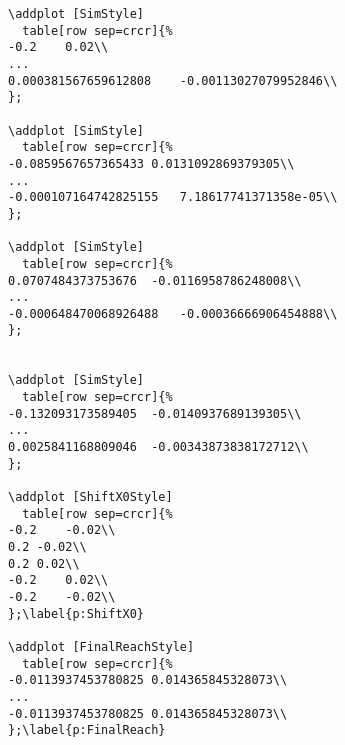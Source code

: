 \begin{verbatim}
\addplot [SimStyle]
  table[row sep=crcr]{%
-0.2	0.02\\
...
0.000381567659612808	-0.00113027079952846\\
};

\addplot [SimStyle]
  table[row sep=crcr]{%
-0.0859567657365433	0.0131092869379305\\
...
-0.000107164742825155	7.18617741371358e-05\\
};

\addplot [SimStyle]
  table[row sep=crcr]{%
0.0707484373753676	-0.0116958786248008\\
...
-0.000648470068926488	-0.00036666906454888\\
};


\addplot [SimStyle]
  table[row sep=crcr]{%
-0.132093173589405	-0.0140937689139305\\
...
0.0025841168809046	-0.00343873838172712\\
};

\addplot [ShiftX0Style]
  table[row sep=crcr]{%
-0.2	-0.02\\
0.2	-0.02\\
0.2	0.02\\
-0.2	0.02\\
-0.2	-0.02\\
};\label{p:ShiftX0}

\addplot [FinalReachStyle]
  table[row sep=crcr]{%
-0.0113937453780825	0.014365845328073\\
...
-0.0113937453780825	0.014365845328073\\
};\label{p:FinalReach}
\end{verbatim}